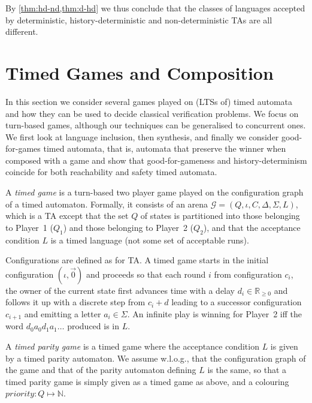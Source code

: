 \documentclass[10pt,a4paper]{amsart}
\theoremstyle{definition}
\numberwithin{equation}{section}
\newcommand{\N}{\mathbb{N}}
\newcommand{\nnreals}{{\mathbb R}_{\geq 0}}
\newcommand{\gsgame}{\mathcal{G}}
\newcommand{\priority}{\mathit{priority}}
\begin{document}
By \cref{thm:hd-nd,thm:d-hd} we thus conclude that the classes of languages accepted by deterministic, history-deterministic and non-deterministic TAs are all different.

	
	\section{Timed Games and Composition}
	\label{sec_games}
	\label{sec:games}
In this section we consider several games played on (LTSs of) timed automata and how they can be used to decide classical verification problems.
We focus on turn-based games, although our techniques can be generalised to concurrent ones. We first look at language inclusion, then synthesis, and finally we consider good-for-games timed automata, that is, automata that preserve the winner when composed with a game and show that good-for-gameness and history-determinism coincide for both reachability and safety timed automata.



\begin{definition} A \emph{timed game} is a turn-based two player
    game played on the configuration graph of a timed automaton.
    Formally, it consists of an arena $\gsgame=(Q,\iota,  C, \Delta,\Sigma,L)$,
    which is a TA except that the set $Q$ of states is partitioned into those belonging to Player~1 ($Q_1$)
    and those belonging to Player~2 ($Q_2$), and that the acceptance condition $L$ is a timed language
    (not some set of acceptable runs).
    
    Configurations are defined as for TA. %
    A timed game starts in the initial configuration $(\iota,\vec{0})$ and proceeds so that each round $i$ from configuration $c_i$, 
the owner of the current state first advances time with a delay $d_i\in \nnreals$
and follows it up with a discrete step from $c_i+d$ leading to a successor configuration $c_{i+1}$ and emitting a letter $a_i\in\Sigma$.
An infinite play is winning for Player~2 iff the word $d_0a_0d_1a_1\dots$ produced is in $L$. %

A \emph{timed parity game} is a timed game where the acceptance condition $L$ is given by a timed parity automaton. We assume w.l.o.g., that the configuration graph of the game and that of the parity automaton defining $L$ is the same, so that a timed parity game is simply given as a timed game as above, and a colouring $\priority:Q\mapsto\N$.
\end{definition}
\end{document}
